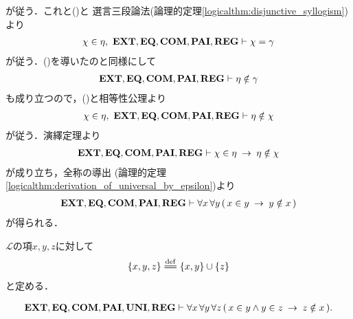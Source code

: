 \begin{sketch}
		が従う．これと()と
		選言三段論法(論理的定理\ref{logicalthm:disjunctive_syllogism})より
		\begin{align}
			\chi \in \eta,\ \mbox{{\bf EXT}},\mbox{{\bf EQ}},\mbox{\bf COM},\mbox{{\bf PAI}},\mbox{{\bf REG}} \vdash 
			\chi = \gamma
			\label{fom:no_pair_of_sets_go_round_9}
		\end{align}
		が従う．()を導いたのと同様にして
		\begin{align}
			\mbox{{\bf EXT}},\mbox{{\bf EQ}},\mbox{\bf COM},\mbox{{\bf PAI}},\mbox{{\bf REG}} \vdash \eta \notin \gamma
		\end{align}
		も成り立つので，()と相等性公理より
		\begin{align}
			\chi \in \eta,\ \mbox{{\bf EXT}},\mbox{{\bf EQ}},\mbox{\bf COM},\mbox{{\bf PAI}},\mbox{{\bf REG}} \vdash 
			\eta \notin \chi
		\end{align}
		が従う．演繹定理より
		\begin{align}
			\mbox{{\bf EXT}},\mbox{{\bf EQ}},\mbox{\bf COM},\mbox{{\bf PAI}},\mbox{{\bf REG}} \vdash 
			\chi \in \eta \hspace{0.25em}\rightarrow\hspace{0.25em} \eta \notin \chi
		\end{align}
		が成り立ち，全称の導出
		(論理的定理\ref{logicalthm:derivation_of_universal_by_epsilon})より
		\begin{align}
			\mbox{{\bf EXT}},\mbox{{\bf EQ}},\mbox{\bf COM},\mbox{{\bf PAI}},\mbox{{\bf REG}} \vdash 
			\forall x\, \forall y\, (\, x \in y \hspace{0.25em}\rightarrow\hspace{0.25em} y \notin x\, )
		\end{align}
		が得られる．
		\QED
	\end{sketch}
	
	$\mathcal{L}$の項$x,y,z$に対して
	\begin{align}
		\{x,y,z\} \defeq \{x,y\} \cup \{z\}
	\end{align}
	と定める．
	
	\begin{screen}
		\begin{thm}[集合のどの三組も所属関係で堂々巡りしない]
		\label{thm:no_three_sets_go_round}
			\begin{align}
				\mbox{{\bf EXT}},\mbox{{\bf EQ}},\mbox{\bf COM},\mbox{{\bf PAI}},\mbox{{\bf UNI}},\mbox{{\bf REG}} \vdash 
				\forall x\, \forall y\, \forall z\, 
				(\, x \in y \wedge y \in z \hspace{0.25em}\rightarrow\hspace{0.25em} z \notin x\, ).
			\end{align}
		\end{thm}
	\end{screen}
	
